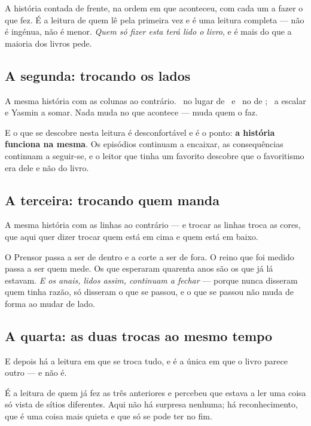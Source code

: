 \documentclass[livro.tex]{subfiles}
\begin{document}
A história contada de frente, na ordem em que aconteceu, com cada um a fazer o que fez. É a
leitura de quem lê pela primeira vez e é uma leitura completa --- não é ingénua, não é menor.
\emph{Quem só fizer esta terá lido o livro}, e é mais do que a maioria dos livros pede.

\subsection*{A segunda: trocando os lados}

A mesma história com as colunas ao contrário. \Drk\ no lugar de \Ben\ e \Ben\ no de \Drk; \Joa\ a
escalar e Yasmin a somar. Nada muda no que acontece --- muda quem o faz.

\medskip

E o que se descobre nesta leitura é desconfortável e é o ponto: \textbf{a história funciona na
mesma}. Os episódios continuam a encaixar, as consequências continuam a seguir-se, e o leitor que
tinha um favorito descobre que o favoritismo era dele e não do livro.

\subsection*{A terceira: trocando quem manda}

A mesma história com as linhas ao contrário --- e trocar as linhas troca as cores, que aqui quer
dizer trocar quem está em cima e quem está em baixo.

\medskip

O Prensor passa a ser de dentro e a corte a ser de fora. O reino que foi medido passa a ser quem
mede. Os que esperaram quarenta anos são os que já lá estavam. \emph{E os anais, lidos assim,
continuam a fechar} --- porque nunca disseram quem tinha razão, só disseram o que se passou, e o
que se passou não muda de forma ao mudar de lado.

\subsection*{A quarta: as duas trocas ao mesmo tempo}

E depois há a leitura em que se troca tudo, e é a única em que o livro parece outro --- e não é.

\medskip

É a leitura de quem já fez as três anteriores e percebeu que estava a ler uma coisa só vista de
sítios diferentes. Aqui não há surpresa nenhuma; há reconhecimento, que é uma coisa mais quieta e
que só se pode ter no fim.
\end{document}
